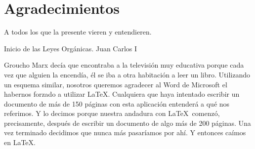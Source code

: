 %
%
%
%
%
%
%
%
%
%
%
%
%

\chapter{Agradecimientos}


\begin{FraseCelebre}
\begin{Frase}
A todos los que la presente vieren y entendieren.
\end{Frase}
\begin{Fuente}
Inicio de las Leyes Orgánicas. Juan Carlos I
\end{Fuente}
\end{FraseCelebre}

Groucho Marx decía que encontraba a la televisión muy educativa porque
cada vez que alguien la encendía, él se iba a otra habitación a leer
un libro. Utilizando un esquema similar, nosotros queremos agradecer
al Word de Microsoft el habernos forzado a utilizar \LaTeX. Cualquiera
que haya intentado escribir un documento de más de 150 páginas con
esta aplicación entenderá a qué nos referimos. Y lo decimos porque
nuestra andadura con \LaTeX\ comenzó, precisamente, después de
escribir un documento de algo más de 200 páginas. Una vez terminado
decidimos que nunca más pasaríamos por ahí. Y entonces caímos en
\LaTeX.

